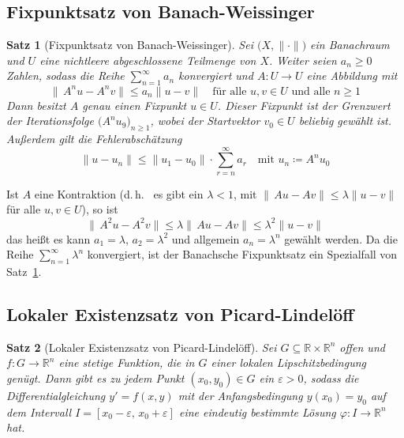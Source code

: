 \documentclass[a4paper, 11pt, accentcolor = tud3b]{tudreport}
\newtheorem{theorem}{Satz}[chapter]
\newcommand{\R}{\mathbb{R}}
\begin{document}
			\subsection{Fixpunktsatz von Banach-Weissinger}
				\begin{theorem}[Fixpunktsatz von Banach-Weissinger]
					Sei \( \big(X, \lVert \cdot \rVert\big) \) ein Banachraum und \(U\) eine nichtleere abgeschlossene Teilmenge von \(X\). Weiter seien \( a_n \geq 0 \) Zahlen, sodass die Reihe \( \sum_{n = 1}^{\infty} a_n \) konvergiert und \( A : U \to U \) eine Abbildung mit
					\begin{equation*}
						\lVert\, A^n u - A^n v \rVert \leq a_n \lVert u - v \rVert \quad\text{für alle } u, v \in U \text{ und alle } n \geq 1
					\end{equation*}
					Dann besitzt \(A\) genau einen Fixpunkt \( u \in U \). Dieser Fixpunkt ist der Grenzwert der Iterationsfolge \( \big(A^n u_9\big)_{n \geq 1} \), wobei der Startvektor \( v_0 \in U \) beliebig gewählt ist. Außerdem gilt die Fehlerabschätzung
					\begin{equation*}
						\lVert u - u_n \rVert \leq \lVert u_1 - u_0 \rVert \cdot \sum_{r = n}^{\infty} a_r \quad\text{mit } u_n \coloneqq A^n u_0
					\end{equation*}
					
					\label{theorem:banach_weissinger_fixed_point_theorem}
				\end{theorem}
			
				Ist \(A\) eine Kontraktion (d.\,h.~ es gibt ein \( \lambda < 1 \), mit \( \lVert\, Au - Av \rVert \leq \lambda \lVert u - v \rVert \) für alle \( u, v \in U \)), so ist
				\begin{equation*}
					\lVert\, A^2 u - A^2 v \rVert \leq \lambda \lVert\, Au - Av \rVert \leq \lambda^2 \lVert u - v \rVert
				\end{equation*}
				das heißt es kann \( a_1 = \lambda \), \( a_2 = \lambda^2 \) und allgemein \( a_n = \lambda^n \) gewählt werden. Da die Reihe \( \sum_{n = 1}^{\infty} \lambda^n \) konvergiert, ist der Banachsche Fixpunktsatz ein Spezialfall von Satz~\ref{theorem:banach_weissinger_fixed_point_theorem}.

			\subsection{Lokaler Existenzsatz von Picard-Lindelöff}
				\begin{theorem}[Lokaler Existenzsatz von Picard-Lindelöff]
					Sei \( G \subseteq \R \times \R^n \) offen und \( f : G \to \R^n \) eine stetige Funktion, die in \(G\) einer lokalen Lipschitzbedingung genügt. Dann gibt es zu jedem Punkt \( (x_0, y_0) \in G \) ein \( \varepsilon > 0 \), sodass die Differentialgleichung \( y' = f(x, y) \) mit der Anfangsbedingung \( y(x_0) = y_0 \) auf dem Intervall \( I = [x_0 - \varepsilon,\, x_0 + \varepsilon] \) eine eindeutig bestimmte Lösung \( \varphi : I \to \R^n \) hat.
				\end{theorem}
\end{document}
